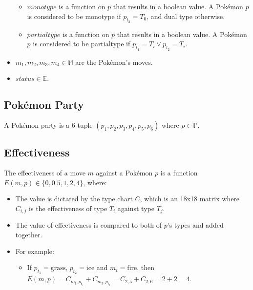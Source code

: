 \begin{itemize}
    \begin{itemize}
        \item $monotype$ is a function on $p$ that results in a boolean value. A Pokémon $p$ is considered to be monotype if $p_{t_2} = T_0$, and dual type otherwise.
        \item $partialtype$ is a function on $p$ that results in a boolean value. A Pokémon $p$ is considered to be partialtype if $p_{t_1} = T_i \lor p_{t_2} = T_i$.
    \end{itemize}
    \item $m_1, m_2, m_3, m_4 \in \mathbb{M}$ are the Pokémon's moves.
    \item $status \in \mathbb{E}$.
\end{itemize}

\subsection{Pokémon Party}

A Pokémon party is a 6-tuple $(p_1, p_2, p_3, p_4, p_5, p_6)$ where $p \in \mathbb{P}$.

\subsection{Effectiveness}

The effectiveness of a move $m$ against a Pokémon $p$ is a function $E(m, p) \in \{0, 0.5, 1, 2, 4\}$, where:
\begin{itemize}
    \item The value is dictated by the type chart $C$, which is an 18x18 matrix where $C_{i, j}$ is the effectiveness of type $T_i$ against type $T_j$.
    \item The value of effectiveness is compared to both of $p$'s types and added together.
    \item For example:
    \begin{itemize}
        \item If $p_{t_1} = \text{grass}$, $p_{t_2} = \text{ice}$ and $m_t = \text{fire}$, then $E(m, p) = C_{m_t, p_{t_1}} + C_{m_t, p_{t_2}} = C_{2, 5} + C_{2, 6} = 2 + 2 = 4$.
    \end{itemize}
\end{itemize}

